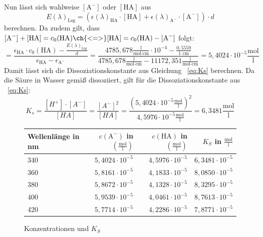 \documentclass{scrartcl}
\begin{document}
Nun lässt sich wahlweise $[\text{A}^-]$ oder $[\text{HA}]$ aus 
\begin{equation}
	E(\lambda)_{\text{Lsg}}=(\epsilon(\lambda)_{\text{HA}}\cdot [\text{HA}] + \epsilon(\lambda)_{\text{A}^-}\cdot [\text{A}^-])\cdot d
\end{equation}
berechnen. Da zudem gilt, dass $[\text{A}^-] + [\text{HA}] = c_0(\text{HA}) \ch{<=>} [\text{HA}] = c_0(\text{HA}) - [\text{A}^-]$ folgt:
\begin{equation}
	[\text{A}^-] = \frac{\epsilon_{\text{HA}}\cdot c_0(\text{HA})- \frac{E(\lambda)_{\text{Lsg}}}{d}}{\epsilon_{\text{HA}} - \epsilon_{\text{A}^-}} = \frac{4785,678 \frac{\text{l}}{\text{mol} \cdot \text{cm}} \cdot 10^{-4} - \frac{0,5559}{1 \text{ cm}}}{4785,678 \frac{\text{l}}{\text{mol} \cdot \text{cm}} - 11172,351 \frac{\text{l}}{\text{mol} \cdot \text{cm}}} = 5,4024 \cdot 10^{-5} \frac{\text{mol}}{\text{l}}
\end{equation}
Damit lässt sich die Dissoziationskonstante aus Gleichung ~\ref{eq:Ks} berechnen. Da die Säure in Wasser gemäß  dissoziiert, gilt für die Dissoziationskonstante aus ~\ref{eq:Ks}:
\begin{equation}
	K_s = \frac{[H^+] \cdot [A^-]}{[HA]} = \frac{[A^-]^2}{[HA]} = \frac{(5,4024 \cdot 10^{-5} \frac{\text{mol}}{\text{l}})^2}{4,5976 \cdot 10^{-5}\frac{\text{mol}}{\text{l}}} = 6,3481 \frac{\text{mol}}{\text{l}}
\end{equation}
\begin{figure}[H]
	\centering
	\caption{Konzentrationen und $K_S$}
	\begin{tabular}{l| r r r}
		Wellenlänge in nm & $c(\text{A}^-)$ in $(\frac{\text{mol}}{\text{l}})$ & $c(\text{HA})$ in $(\frac{\text{mol}}{\text{l}})$ & $K_S$ in $\frac{\text{mol}}{\text{l}}$ \\ \hline \hline
		340  & $ 5,4024\cdot 10^{-5} $ & $	4,5976\cdot 10^{-5} $ & $	6,3481\cdot 10^{-5}$ \\
		360  & $	5,8161\cdot 10^{-5} $ & $	4,1833\cdot 10^{-5} $ & $ 8,0850\cdot 10^{-5}$ \\
		380  & $	5,8672\cdot 10^{-5} $ & $	4,1328\cdot 10^{-5} $ & $	8,3295\cdot 10^{-5}$ \\
		400  & $	5,9539\cdot 10^{-5} $ & $	4,0461\cdot 10^{-5} $ & $	8,7613\cdot 10^{-5}$ \\
		420  & $	5,7714\cdot 10^{-5} $ & $	4,2286\cdot 10^{-5} $ & $	7,8771\cdot 10^{-5}$
\end{tabular}
\end{figure}
\end{document}
